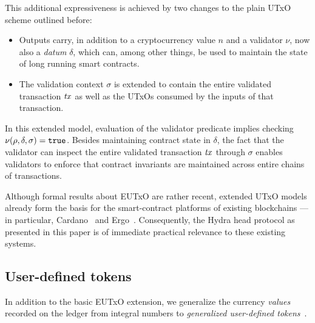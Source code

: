 This additional expressiveness is achieved by two changes to the plain UTxO scheme outlined before: 

\begin{itemize}
\item Outputs carry, in addition to a cryptocurrency value $n$ and a validator $\nu$, now also a \emph{datum} $\delta$, which can, among other things, be used to maintain the state of long running smart contracts.
\item The validation context $\sigma$ is extended to contain the entire validated transaction $\mathit{tx}$ as well as the UTxOs consumed by the inputs of that transaction.
\end{itemize}

In this extended model, evaluation of the validator predicate implies checking \(\nu(\rho, \delta, \sigma) = \mathtt{true}\). Besides maintaining contract state in $\delta$, the fact that the validator can inspect the entire validated transaction $\mathit{tx}$ through $\sigma$ enables validators to enforce that contract invariants are maintained across entire chains of transactions.

Although formal results about EUTxO are rather recent, extended UTxO models already form the basis for the smart-contract platforms of existing blockchains --- in particular, Cardano~\cite{plutus-platform} and Ergo~\cite{ergo-platform}. Consequently, the Hydra head protocol as presented in this paper is of immediate practical relevance to these existing systems.

\subsection{User-defined tokens}

In addition to the basic EUTxO extension, we generalize the currency \emph{values} recorded on the ledger from integral numbers to \emph{generalized user-defined tokens}~\cite{eutxo-2}.



